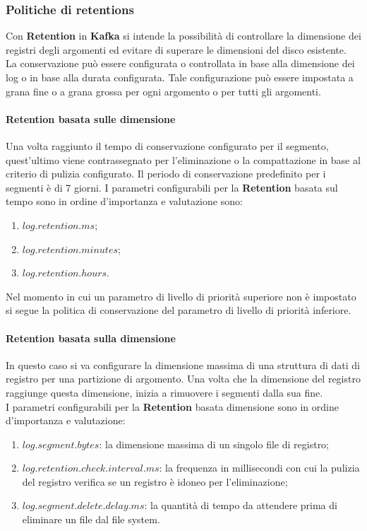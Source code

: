 \subsubsection{Politiche di retentions}
Con \textbf{Retention} in \textbf{Kafka} si intende la possibilità di controllare la dimensione dei registri
degli argomenti ed evitare di superare le dimensioni del disco esistente.\\
La conservazione può essere configurata o controllata in base alla dimensione dei \gls{log}{} o in
base alla durata configurata. Tale configurazione può essere impostata a grana fine o a
grana grossa per ogni argomento o per tutti gli argomenti.
\paragraph{Retention basata sulle dimensione}
Una volta raggiunto il tempo di conservazione configurato per il segmento, quest'ultimo viene contrassegnato per l'eliminazione o la \gls{compattazione}{} in base al criterio di pulizia configurato. Il periodo di conservazione predefinito per i segmenti è di 7 giorni.
I parametri configurabili per la \textbf{Retention} basata sul tempo sono in ordine d'importanza e valutazione sono:
\begin{enumerate}
    \item $log.retention.ms$;
    \item $log.retention.minutes$;
    \item $log.retention.hours$.
\end{enumerate}
Nel momento in cui un parametro di livello di priorità superiore non è impostato si segue la politica di conservazione del parametro di livello di priorità inferiore.\\
\paragraph{Retention basata sulla dimensione}
In questo caso si va configurare la dimensione massima di una struttura di dati di registro per una partizione di argomento. Una volta che la dimensione del registro raggiunge questa dimensione, inizia a rimuovere i segmenti dalla sua fine.\\

I parametri configurabili per la \textbf{Retention} basata dimensione sono in ordine d'importanza e valutazione:
\begin{enumerate}
    \item $log.segment.bytes$: la dimensione massima di un singolo file di registro;
    \item $log.retention.check.interval.ms$: la frequenza in millisecondi con cui la pulizia del registro verifica se un registro è idoneo per l'eliminazione;
    \item $log.segment.delete.delay.ms$: la quantità di tempo da attendere prima di eliminare un file dal file system.
\end{enumerate}


